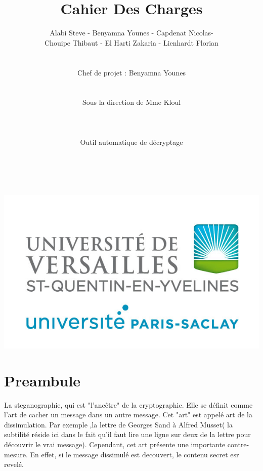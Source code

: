 \documentclass[a4]{article}
\begin{document}
\title{\Huge{\textbf{Cahier Des Charges}}}
  \author{Alabi Steve - Benyamna Younes - Capdenat Nicolas- \\
		Chouipe Thibaut - El Harti Zakaria - Lienhardt Florian \\ \\ \\
		Chef de projet : Benyamna Younes \\ \\ \\ 
		Sous la direction de Mme Kloul \\ \\ \\ \\
		Outil automatique de décryptage \\ \\ \\}
		

\begin{titlepage}
 

\maketitle
\vspace{20em}
 \begin{center}\includegraphics{logo_uvsq.jpg}\end{center}
\end{titlepage}
		\section{Preambule}
				La steganographie, qui est "l'ancêtre" de la cryptographie. Elle se définit comme l'art de cacher un message dans un autre message. Cet "art"
				est appelé art de la dissimulation. 
				Par exemple ,la lettre de Georges Sand à Alfred Musset( la subtilité réside ici dans le fait qu'il faut lire une ligne sur deux de la lettre pour découvrir le vrai message).
				Cependant, cet art présente une importante contre-mesure. En effet, si le message dissimulé est decouvert, le contenu secret esr revelé.
\end{document}
